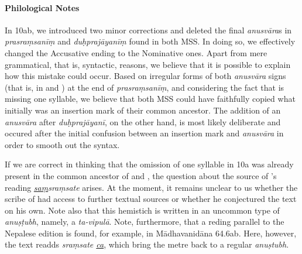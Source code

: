 \paragraph*{Philological Notes}
In 10ab, we introduced two minor corrections and deleted the final 
\emph{anusvāra}s in \emph{prasraṃsanīṃ} and \emph{duḥprajāyanīṃ} found 
in both MSS. In doing so, we effectively changed the Accusative ending to the 
Nominative ones. Apart from mere grammatical, that is, syntactic, reasons, we 
believe that it is possible to explain how this mistake could occur. Based on 
irregular forms of both \emph{anusvāra} signs (that is, in  and ) at the end of \emph{prasraṃsanīṃ}, 
and considering the fact that  is missing one syllable, 
we believe that both MSS could have faithfully copied what initially was an 
insertion mark of their common ancestor. The addition of an \emph{anusvāra} 
after \emph{duḥprajāyanī}, on the other hand, is most likely deliberate and 
occured after the initial confusion between an insertion mark and 
\emph{anusvāra} in order to smooth out the syntax.  

If we are correct in thinking that the omission of one syllable in 10a was already 
present in the common ancestor of  and 
, the question about the source of 
's reading \emph{\underline{saṃ}sraṃsate} 
arises. At the moment, it remains unclear to us whether the scribe of 
 had access to further textual sources or whether 
he conjectured the text on his own. Note also that this hemistich is written in an 
uncommon type of \emph{anuṣṭubh}, namely, a \emph{ta-vipulā}. Note, 
furthermore, that a reding parallel to the Nepalese edition is found, for example, 
in Mādhavanidāna 64.6ab. Here, however, the text readds \emph{sraṃsate 
\underline{ca}}, which bring the metre back to a regular \emph{anuṣtubh}.  

